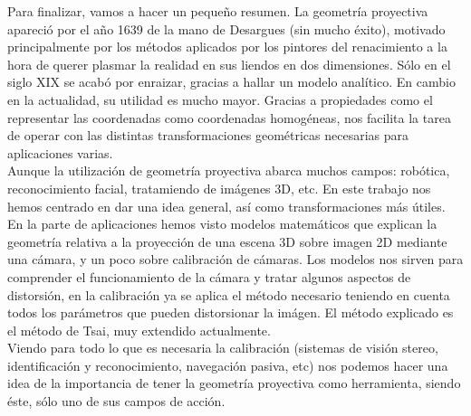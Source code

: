 \documentclass[a4,10pt]{article}
\begin{document}
Para finalizar, vamos a hacer un pequeño resumen. La geometría proyectiva apareció por el año 1639 de la mano de Desargues (sin mucho éxito), motivado principalmente por los métodos aplicados por los pintores del renacimiento a la hora de querer plasmar la realidad en sus liendos en dos dimensiones. Sólo en el siglo XIX se acabó por enraizar, gracias a hallar un modelo analítico. En cambio en la actualidad, su utilidad es mucho mayor. Gracias a propiedades como el representar las coordenadas como coordenadas homogéneas, nos facilita la tarea de operar con las distintas transformaciones geométricas necesarias para aplicaciones varias.\\
Aunque la utilización de geometría proyectiva abarca muchos campos: robótica, reconocimiento facial, tratamiendo de imágenes 3D, etc. En este trabajo nos hemos centrado en dar una idea general, así como transformaciones más útiles. En la parte de aplicaciones hemos visto modelos matemáticos que explican la geometría relativa a la proyección de una escena 3D sobre imagen 2D mediante una cámara, y un poco sobre calibración de cámaras. Los modelos nos sirven para comprender el funcionamiento de la cámara y tratar algunos aspectos de distorsión, en la calibración ya se aplica el método necesario teniendo en cuenta todos los parámetros que pueden distorsionar la imágen. El método explicado es el método de Tsai, muy extendido actualmente.\\
Viendo para todo lo que es necesaria la calibración (sistemas de visión stereo, identificación y reconocimiento, navegación pasiva, etc) nos podemos hacer una idea de la importancia de tener la geometría proyectiva como herramienta, siendo éste, sólo uno de sus campos de acción.\\ 



\end{document}
